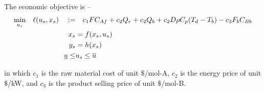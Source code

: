 \documentclass{article}
\begin{document}
The economic objective is -- 
\begin{align*}
  \underset{u_s}{\textnormal{min}} \quad 
  \ell(u_s, x_s) \quad := & \quad c_1FC_{Af} + c_2Q_r + 
                                      c_2Q_b + c_2D\rho C_p(T_d-T_b) - 
                                      c_3F_bC_{Bb} \\
  x_s &= f(x_s, u_s)\\ 
  y_s &= h(x_s) \\
  \underline{u} \leq &u_s \leq \overline{u}
\end{align*}

in which $c_1$ is the raw material cost of unit $\$$/mol-A,
$c_2$ is the energy price of unit $\$$/kW, 
and $c_3$ is the product selling price of unit $\$$/mol-B.
\end{document}
